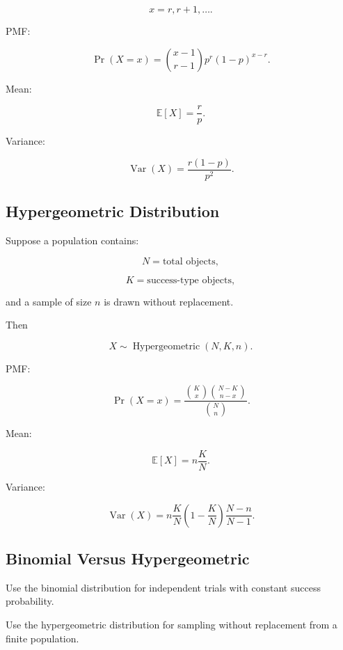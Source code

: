 \[
\boxed{
x=r,r+1,\ldots.
}
\]

PMF:

\[
\boxed{
\Pr(X=x)
=
\binom{x-1}{r-1}
p^r(1-p)^{x-r}.
}
\]

Mean:

\[
\boxed{
\mathbb{E}[X]
=
\frac{r}{p}.
}
\]

Variance:

\[
\boxed{
\operatorname{Var}(X)
=
\frac{
r(1-p)
}{
p^2
}.
}
\]

\subsection{Hypergeometric Distribution}
\label{subsec:hypergeometric-distribution-reference}

Suppose a population contains:

\[
N
=
\text{total objects},
\]

\[
K
=
\text{success-type objects},
\]

and a sample of size \(n\) is drawn without replacement.

Then

\[
\boxed{
X\sim\operatorname{Hypergeometric}(N,K,n).
}
\]

PMF:

\[
\boxed{
\Pr(X=x)
=
\frac{
\binom{K}{x}
\binom{N-K}{n-x}
}{
\binom{N}{n}
}.
}
\]

Mean:

\[
\boxed{
\mathbb{E}[X]
=
n\frac{K}{N}.
}
\]

Variance:

\[
\boxed{
\operatorname{Var}(X)
=
n
\frac{K}{N}
\left(
1-\frac{K}{N}
\right)
\frac{
N-n
}{
N-1
}.
}
\]

\subsection{Binomial Versus Hypergeometric}
\label{subsec:binomial-vs-hypergeometric}

Use the binomial distribution for independent trials with constant success
probability.

Use the hypergeometric distribution for sampling without replacement from a
finite population.

